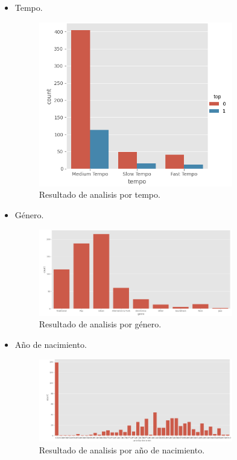 \documentclass[a4paper,12pt]{article}
\begin{document}
\begin{itemize}
\begin{figure}[H]
    \end{figure}
    \item Tempo.
    \begin{figure}[H]
        \centering
        \includegraphics[width=0.8\textwidth]{9.png}
        \caption{Resultado de analisis por tempo.}

    \end{figure}
    \item Género.
    \begin{figure}[H]
        \centering
        \includegraphics[width=0.8\textwidth]{10.png}
        \caption{Resultado de analisis por género.}

    \end{figure}
    \item Año de nacimiento.
    \begin{figure}[H]
        \centering
        \includegraphics[width=0.8\textwidth]{11.png}
        \caption{Resultado de analisis por año de nacimiento.}

    \end{figure}
\end{itemize}
\end{document}
